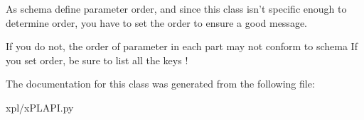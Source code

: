 As schema define parameter order, and since this class isn't specific enough to determine order, you have to set the order to ensure a good message. 

If you do not, the order of parameter in each part may not conform to schema If you set order, be sure to list all the keys ! 

The documentation for this class was generated from the following file:\begin{CompactItemize}
\item 
xpl/xPLAPI.py\end{CompactItemize}
